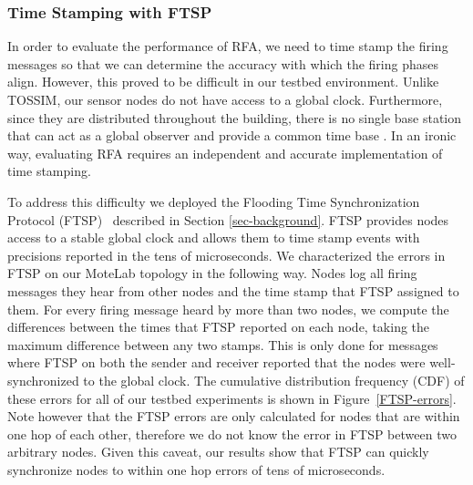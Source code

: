 \subsubsection{Time Stamping with FTSP}
\label{FTSP}

In order to evaluate the performance of RFA, we need to time stamp the
firing messages so that we can determine the accuracy with which the
firing phases align. However, this proved to be difficult in our
testbed environment. Unlike TOSSIM, our sensor nodes do not
have access to a global clock. Furthermore, since they are distributed
throughout the building, there is no single base station that can act
as a global observer and provide a common time base \cite{ftsp}. In an
ironic way, evaluating RFA requires an independent and accurate
implementation of time stamping.



To address this difficulty we deployed the Flooding Time
Synchronization Protocol (FTSP)~\cite{ftsp} described in Section
\ref{sec-background}. FTSP provides nodes access to a stable global
clock and allows them to time stamp events with precisions reported in
the tens of microseconds. We characterized the errors in FTSP on our
MoteLab topology in the following way. Nodes log all firing messages
they hear from other nodes and the time stamp that FTSP assigned to
them. For every firing message heard by more than two nodes, we
compute the differences between the times that FTSP reported on each
node, taking the maximum difference between any two stamps. This is
only done for messages where FTSP on both the sender and receiver
reported that the nodes were well-synchronized to the global
clock. The cumulative distribution frequency (CDF) of these errors for
all of our testbed experiments is shown in
Figure~\ref{FTSP-errors}. Note however that the FTSP errors are only
calculated for nodes that are within one hop of each other, therefore we
do not know the error in FTSP between two arbitrary nodes. Given this
caveat, our results show that FTSP can quickly synchronize nodes to
within one hop errors of tens of microseconds.

